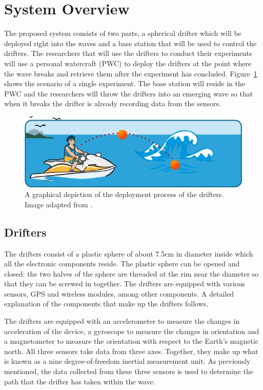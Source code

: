\section{System Overview}
The proposed system consists of two parts, a spherical drifter which will be deployed right into the waves and a base station that will be used to control the drifters.  The researchers that will use the drifters to conduct their experiments will use a personal watercraft (PWC) to deploy the drifters at the point where the wave breaks and retrieve them after the experiment has concluded. Figure~\ref{fig:systemOverview} shows the scenario of a single experiment.  The base station will reside in the PWC and the researchers will throw the drifters into an emerging wave so that when it breaks the drifter is already recording data from the sensors.    

\begin{figure}[H]
	\centering
	\includegraphics[width=\textwidth]{img/systemOverview}
	\caption{A graphical depiction of the deployment process of the drifters. Image adapted from \cite{boaterExam}. \label{fig:systemOverview}}
\end{figure}

\subsection{Drifters}
The drifters consist of a plastic sphere of about 7.5cm in diameter inside which all the electronic components reside.  The plastic sphere can be opened and closed: the two halves of the sphere are threaded at the rim near the diameter so that they can be screwed in together. The drifters are equipped with various sensors, GPS and wireless modules, among other components.  A detailed explanation of the components that make up the drifters follows.


The drifters are equipped with an accelerometer to measure the changes in acceleration of the device, a gyroscope to measure the changes in orientation and a magnetometer to measure the orientation with respect to the Earth's magnetic north.  All three sensors take data from three axes.  Together, they make up what is known as a nine degree-of-freedom inertial measurement unit.  As previously mentioned, the data collected from these three sensors is used to determine the path that the drifter has taken within the wave.

